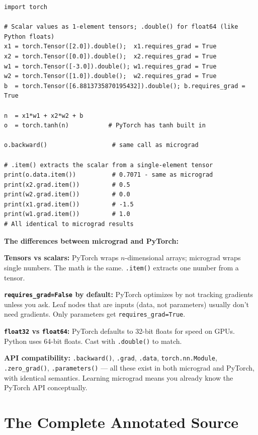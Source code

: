 \documentclass[12pt,a4paper]{article}
\newcommand{\code}[1]{\texttt{\small\color{deepblue}#1}}
\begin{document}
\begin{lstlisting}
import torch

# Scalar values as 1-element tensors; .double() for float64 (like Python floats)
x1 = torch.Tensor([2.0]).double();  x1.requires_grad = True
x2 = torch.Tensor([0.0]).double();  x2.requires_grad = True
w1 = torch.Tensor([-3.0]).double(); w1.requires_grad = True
w2 = torch.Tensor([1.0]).double();  w2.requires_grad = True
b  = torch.Tensor([6.8813735870195432]).double(); b.requires_grad = True

n  = x1*w1 + x2*w2 + b
o  = torch.tanh(n)           # PyTorch has tanh built in

o.backward()                  # same call as micrograd

# .item() extracts the scalar from a single-element tensor
print(o.data.item())          # 0.7071 - same as micrograd
print(x2.grad.item())         # 0.5
print(w2.grad.item())         # 0.0
print(x1.grad.item())         # -1.5
print(w1.grad.item())         # 1.0
# All identical to micrograd results
\end{lstlisting}

\begin{tipbox}
\textbf{The differences between micrograd and PyTorch:}

\textbf{Tensors vs scalars:} PyTorch wraps $n$-dimensional arrays; micrograd wraps single numbers. The math is the same. \code{.item()} extracts one number from a tensor.

\textbf{\code{requires\_grad=False} by default:} PyTorch optimizes by not tracking gradients unless you ask. Leaf nodes that are inputs (data, not parameters) usually don't need gradients. Only parameters get \code{requires\_grad=True}.

\textbf{\code{float32} vs \code{float64}:} PyTorch defaults to 32-bit floats for speed on GPUs. Python uses 64-bit floats. Cast with \code{.double()} to match.

\textbf{API compatibility:} \code{.backward()}, \code{.grad}, \code{.data}, \code{torch.nn.Module}, \code{.zero\_grad()}, \code{.parameters()} — all these exist in both micrograd and PyTorch, with identical semantics. Learning micrograd means you already know the PyTorch API conceptually.
\end{tipbox}

\section{The Complete Annotated Source}
\end{document}
